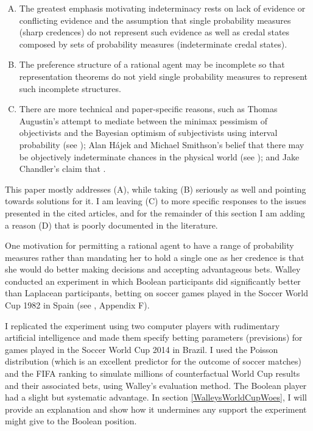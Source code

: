 \documentclass[11pt]{article}
\begin{document}
\begin{enumerate}[(A)]
\item The greatest emphasis motivating indeterminacy rests on lack of
  evidence or conflicting evidence and the assumption that single
  probability measures (sharp credences) do not represent such
  evidence as well as credal states composed by sets of probability
  measures (indeterminate credal states).
\item The preference structure of a rational agent may be incomplete
  so that representation theorems do not yield single probability
  measures to represent such incomplete structures.
\item There are more technical and paper-specific reasons, such as
  Thomas Augustin's attempt to mediate between the minimax pessimism
  of objectivists and the Bayesian optimism of subjectivists using
  interval probability (see ); Alan
  H{\'a}jek and Michael Smithson's belief that there may be
  objectively indeterminate chances in the physical world (see
  ); and Jake Chandler's claim that
   .
\end{enumerate}

This paper mostly addresses (A), while taking (B) seriously as well
and pointing towards solutions for it. I am leaving (C) to more
specific responses to the issues presented in the cited articles, and
for the remainder of this section I am adding a reason (D) that is
poorly documented in the literature.

One motivation for permitting a rational agent to have a range of
probability measures rather than mandating her to hold a single one as
her credence is that she would do better making decisions and
accepting advantageous bets. Walley conducted an experiment in which
Boolean participants did significantly better than Laplacean
participants, betting on soccer games played in the Soccer World Cup
1982 in Spain (see , Appendix F). 

I replicated the experiment using two computer players with
rudimentary artificial intelligence and made them specify betting
parameters (previsions) for games played in the Soccer World Cup 2014
in Brazil. I used the Poisson distribution (which is an excellent
predictor for the outcome of soccer matches) and the FIFA ranking to
simulate millions of counterfactual World Cup results and their
associated bets, using Walley's evaluation method. The Boolean player
had a slight but systematic advantage. In section
\ref{WalleysWorldCupWoes}, I will provide an explanation and show how
it undermines any support the experiment might give to the Boolean
position.
\end{document}
